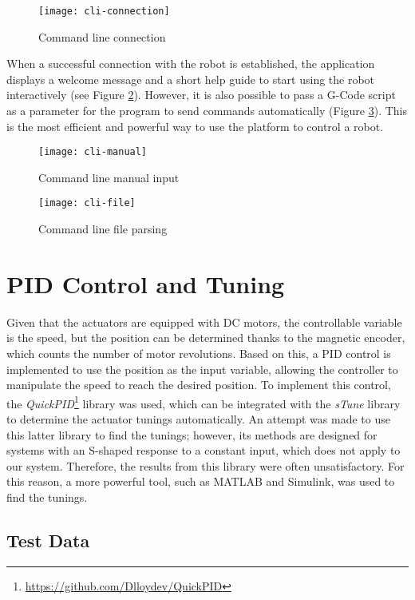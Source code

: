 \begin{figure}[H]
    \centering
    \texttt{[image: cli-connection]}
    \caption{Command line connection}
    \label{fig:cli-connection}
\end{figure}

When a successful connection with the robot is established, the application displays a welcome message and a short help guide to start using the robot interactively (see Figure \ref{fig:cli-manual}). However, it is also possible to pass a G-Code script as a parameter for the program to send commands automatically (Figure \ref{fig:cli-file}). This is the most efficient and powerful way to use the platform to control a robot.


\begin{figure}[H]
    \centering
    \texttt{[image: cli-manual]}
    \caption{Command line manual input}
    \label{fig:cli-manual}
\end{figure}

\begin{figure}[H]
    \centering
    \texttt{[image: cli-file]}
    \caption{Command line file parsing}
    \label{fig:cli-file}
\end{figure}

\section{PID Control and Tuning}

Given that the actuators are equipped with DC motors, the controllable variable is the speed, but the position can be determined thanks to the magnetic encoder, which counts the number of motor revolutions. Based on this, a PID control is implemented to use the position as the input variable, allowing the controller to manipulate the speed to reach the desired position. To implement this control, the \textit{QuickPID}\footnote{\url{https://github.com/Dlloydev/QuickPID}} library was used, which can be integrated with the \textit{sTune} library to determine the actuator tunings automatically. An attempt was made to use this latter library to find the tunings; however, its methods are designed for systems with an S-shaped response to a constant input, which does not apply to our system. Therefore, the results from this library were often unsatisfactory. For this reason, a more powerful tool, such as MATLAB and Simulink, was used to find the tunings.

\subsection{Test Data}

